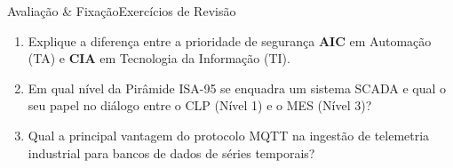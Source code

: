 \begin{senaiframe}{Avaliação \& Fixação}{Exercícios de Revisão}
  \begin{enumerate}
    \item Explique a diferença entre a prioridade de segurança \textbf{AIC} em Automação (TA) e \textbf{CIA} em Tecnologia da Informação (TI).
    \item Em qual nível da Pirâmide ISA-95 se enquadra um sistema SCADA e qual o seu papel no diálogo entre o CLP (Nível 1) e o MES (Nível 3)?
    \item Qual a principal vantagem do protocolo MQTT na ingestão de telemetria industrial para bancos de dados de séries temporais?
  \end{enumerate}
\end{senaiframe}
